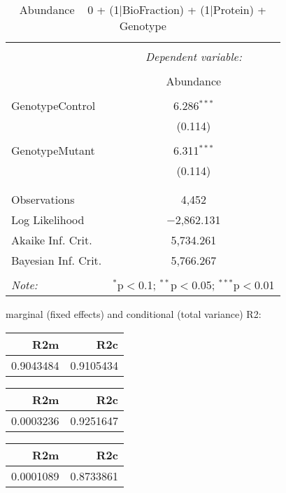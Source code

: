 \documentclass[11pt]{report}
\begin{document}
\begin{table}[!htbp] \centering 
  \caption{Abundance ~ 0 + (1|BioFraction) + (1|Protein) + Genotype} 
  \label{} 
\begin{tabular}{@{\extracolsep{5pt}}lc} 
\\[-1.8ex]\hline 
\hline \\[-1.8ex] 
 & \multicolumn{1}{c}{\textit{Dependent variable:}} \\ 
\cline{2-2} 
\\[-1.8ex] & Abundance \\ 
\hline \\[-1.8ex] 
 GenotypeControl & 6.286$^{***}$ \\ 
  & (0.114) \\ 
  & \\ 
 GenotypeMutant & 6.311$^{***}$ \\ 
  & (0.114) \\ 
  & \\ 
\hline \\[-1.8ex] 
Observations & 4,452 \\ 
Log Likelihood & $-$2,862.131 \\ 
Akaike Inf. Crit. & 5,734.261 \\ 
Bayesian Inf. Crit. & 5,766.267 \\ 
\hline 
\hline \\[-1.8ex] 
\textit{Note:}  & \multicolumn{1}{r}{$^{*}$p$<$0.1; $^{**}$p$<$0.05; $^{***}$p$<$0.01} \\ 
\end{tabular} 
\end{table} 
marginal (fixed effects) and conditional (total variance) R2:

\begin{tabular}{r|r}
\hline
R2m & R2c\\
\hline
0.9043484 & 0.9105434\\
\hline
\end{tabular}

\begin{tabular}{r|r}
\hline
R2m & R2c\\
\hline
0.0003236 & 0.9251647\\
\hline
\end{tabular}

\begin{tabular}{r|r}
\hline
R2m & R2c\\
\hline
0.0001089 & 0.8733861\\
\hline
\end{tabular}
\end{document}

